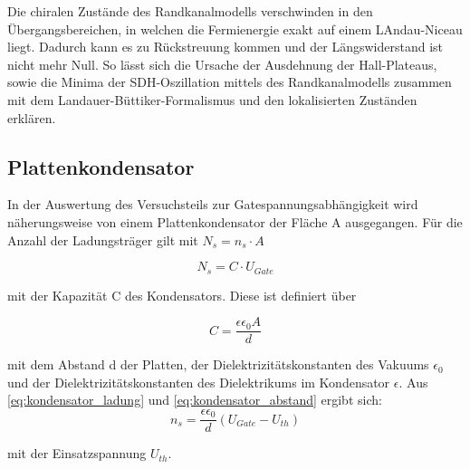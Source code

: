 Die chiralen Zustände des Randkanalmodells verschwinden in den Übergangsbereichen, in welchen die Fermienergie exakt auf einem LAndau-Niceau liegt. Dadurch kann es zu Rückstreuung kommen und der Längswiderstand ist nicht mehr Null.  
So lässt sich die Ursache der Ausdehnung der Hall-Plateaus, sowie die Minima der SDH-Oszillation mittels des Randkanalmodells zusammen mit dem Landauer-Büttiker-Formalismus und den lokalisierten Zuständen erklären.


\subsection{Plattenkondensator}

In der Auswertung des Versuchsteils zur Gatespannungsabhängigkeit wird näherungsweise von einem Plattenkondensator der Fläche A ausgegangen. Für die Anzahl der Ladungsträger gilt mit $N_s=n_s \cdot A$ 

\begin{equation}
N_s=C \cdot U_{Gate}
\label{eq:kondensator_ladung}
\end{equation}

mit der Kapazität C des Kondensators. Diese ist definiert über

\begin{equation}
C=\frac{\epsilon \epsilon_0 A}{d}
\label{eq:kondensator_abstand}
\end{equation}

mit dem Abstand d der Platten, der Dielektrizitätskonstanten des Vakuums $\epsilon_0$ und der Dielektrizitätskonstanten des Dielektrikums im Kondensator $\epsilon$. 
Aus \ref{eq:kondensator_ladung} und \ref{eq:kondensator_abstand} ergibt sich:
\begin{equation}
n_s=\frac{\epsilon \epsilon_0}{d}(U_{Gate}-U_{th})
\label{eq:kondens_lad_und_abst}
\end{equation}

mit der Einsatzspannung $U_{th}$.

